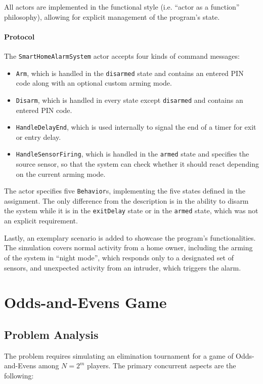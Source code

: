 \documentclass{scrartcl}
\begin{document}
All actors are implemented in the functional style (i.e. ``actor as a function'' philosophy), allowing for explicit management of the program's state.

\paragraph{Protocol} The \texttt{SmartHomeAlarmSystem} actor accepts four kinds of command messages:
\begin{itemize}
\item \texttt{Arm}, which is handled in the \texttt{disarmed} state and contains an entered PIN code along with an optional custom arming mode.
\item \texttt{Disarm}, which is handled in every state except \texttt{disarmed} and contains an entered PIN code.
\item \texttt{HandleDelayEnd}, which is used internally to signal the end of a timer for exit or entry delay.
\item \texttt{HandleSensorFiring}, which is handled in the \texttt{armed} state and specifies the source sensor, so that the system can check whether it should react depending on the current arming mode.
\end{itemize}

The actor specifies five \texttt{Behavior}s, implementing the five states defined in the assignment. The only difference from the description is in the ability to disarm the system while it is in the \texttt{exitDelay} state or in the \texttt{armed} state, which was not an explicit requirement.

Lastly, an exemplary scenario is added to showcase the program's functionalities. The simulation covers normal activity from a home owner, including the arming of the system in ``night mode'', which responds only to a designated set of sensors, and unexpected activity from an intruder, which triggers the alarm.

\section{Odds-and-Evens Game}

\subsection{Problem Analysis}

The problem requires simulating an elimination tournament for a game of Odds-and-Evens among $N = 2^m$ players. The primary concurrent aspects are the following:
\end{document}
